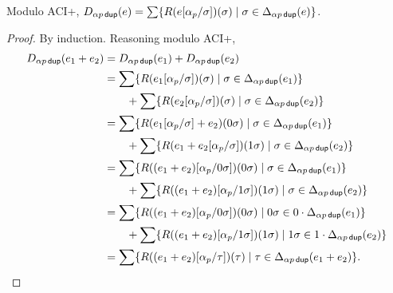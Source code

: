 \documentclass{article}
\newcommand\pdup{\mathop{\mathsf{dup}}}
\newcommand\STD{\Delta}
\begin{document}
\begin{lemma}
\label{eq:ABDelta}
Modulo ACI+, $D_{\alpha p\pdup}(e) = \sum\set{\rep\sigma{e\subst{\alpha_p}\sigma}}{\sigma\in\STD_{\alpha p\pdup}(e)}$.
\end{lemma}
\begin{proof}
By induction. Reasoning modulo ACI+,
\begin{align*}
D_{\alpha p\pdup}(e_1+e_2) &= D_{\alpha p\pdup}(e_1) + D_{\alpha p\pdup}(e_2)\\
&= \sum\set{\rep\sigma{e_1\subst{\alpha_p}\sigma}}{\sigma\in\STD_{\alpha p\pdup}(e_1)}\\
& \qquad + \sum\set{\rep\sigma{e_2\subst{\alpha_p}\sigma}}{\sigma\in\STD_{\alpha p\pdup}(e_2)}\\
&= \sum\set{\rep{0\sigma}{e_1\subst{\alpha_p}\sigma+e_2}}{\sigma\in\STD_{\alpha p\pdup}(e_1)}\\
& \qquad + \sum\set{\rep{1\sigma}{e_1+e_2\subst{\alpha_p}\sigma}}{\sigma\in\STD_{\alpha p\pdup}(e_2)}\\
&= \sum\set{\rep{0\sigma}{(e_1+e_2)\subst{\alpha_p}{0\sigma}}}{\sigma\in\STD_{\alpha p\pdup}(e_1)}\\
& \qquad + \sum\set{\rep{1\sigma}{(e_1+e_2)\subst{\alpha_p}{1\sigma}}}{\sigma\in\STD_{\alpha p\pdup}(e_2)}\\
&= \sum\set{\rep{0\sigma}{(e_1+e_2)\subst{\alpha_p}{0\sigma}}}{0\sigma\in 0\cdot\STD_{\alpha p\pdup}(e_1)}\\
& \qquad + \sum\set{\rep{1\sigma}{(e_1+e_2)\subst{\alpha_p}{1\sigma}}}{1\sigma\in 1\cdot\STD_{\alpha p\pdup}(e_2)}\\
&= \sum\set{\rep{\tau}{(e_1+e_2)\subst{\alpha_p}{\tau}}}{\tau\in\STD_{\alpha p\pdup}(e_1+e_2)}.
\end{align*}

\end{proof}
\end{document}
